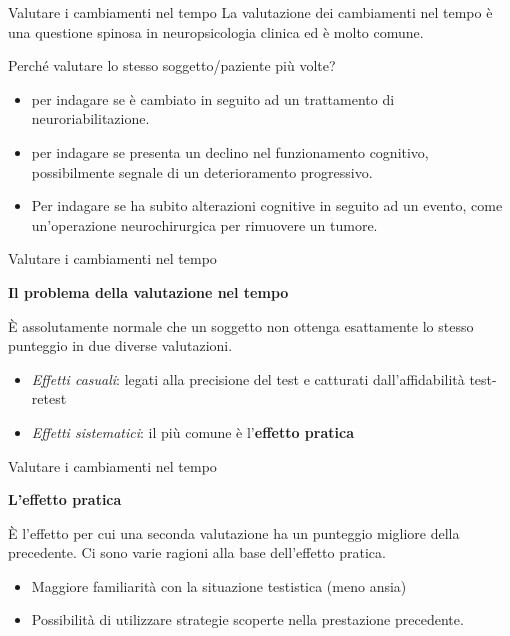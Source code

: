 \documentclass[
  ignorenonframetext,
]{beamer}
\begin{document}
\begin{frame}{Valutare i cambiamenti nel tempo}
\label{valutare-i-cambiamenti-nel-tempo}
La valutazione dei cambiamenti nel tempo è una questione spinosa in
neuropsicologia clinica ed è molto comune.

Perché valutare lo stesso soggetto/paziente più volte?

\begin{itemize}
\item
  per indagare se è cambiato in seguito ad un trattamento di
  neuroriabilitazione.
\item
  per indagare se presenta un declino nel funzionamento cognitivo,
  possibilmente segnale di un deterioramento progressivo.
\item
  Per indagare se ha subito alterazioni cognitive in seguito ad un
  evento, come un'operazione neurochirurgica per rimuovere un tumore.
\end{itemize}
\end{frame}

\begin{frame}{Valutare i cambiamenti nel tempo}
\label{valutare-i-cambiamenti-nel-tempo-1}
\begin{center}
  \textbf{Il problema della valutazione nel tempo}
\end{center}
\vspace{2em}

È assolutamente normale che un soggetto non ottenga esattamente lo
stesso punteggio in due diverse valutazioni.

\begin{itemize}
\item
  \emph{Effetti casuali}: legati alla precisione del test e catturati
  dall'affidabilità test-retest
\item
  \emph{Effetti sistematici}: il più comune è l'\textbf{effetto pratica}
\end{itemize}
\end{frame}

\begin{frame}{Valutare i cambiamenti nel tempo}
\label{valutare-i-cambiamenti-nel-tempo-2}
\begin{center}
  \textbf{L'effetto pratica}
\end{center}
\vspace{1em}

È l'effetto per cui una seconda valutazione ha un punteggio migliore
della precedente. Ci sono varie ragioni alla base dell'effetto pratica.

\begin{itemize}
\item
  Maggiore familiarità con la situazione testistica (meno ansia)
\item
  Possibilità di utilizzare strategie scoperte nella prestazione
  precedente.
\end{itemize}
\end{frame}
\end{document}
